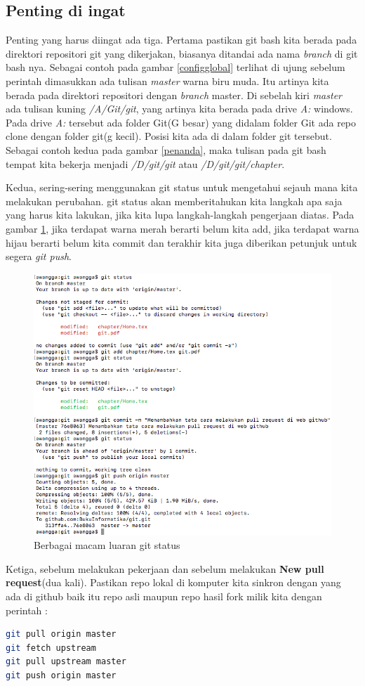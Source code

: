 \subsection{Penting di ingat}
Penting yang harus diingat ada tiga. Pertama pastikan git bash kita berada pada direktori repositori git yang dikerjakan, biasanya ditandai ada nama \textit{branch} di git bash nya. Sebagai contoh pada gambar \ref{configglobal} terlihat di ujung sebelum perintah dimasukkan ada tulisan \textit{master} warna biru muda. Itu artinya kita berada pada direktori repositori dengan \textit{branch} master. Di sebelah kiri \textit{master} ada tulisan kuning \textit{/A/Git/git}, yang artinya kita berada pada drive \textit{A:} windows. Pada drive \textit{A:} tersebut ada folder Git(G besar) yang didalam folder Git ada repo clone dengan folder git(g kecil). Posisi kita ada di dalam folder git tersebut.
Sebagai contoh kedua pada gambar \ref{penanda}, maka tulisan pada git bash tempat kita bekerja menjadi \textit{/D/git/git} atau \textit{/D/git/git/chapter}.

Kedua, sering-sering menggunakan git status untuk mengetahui sejauh mana kita melakukan perubahan. git status akan memberitahukan kita langkah apa saja yang harus kita lakukan, jika kita lupa langkah-langkah pengerjaan diatas. Pada gambar \ref{gitstatus}, jika terdapat warna merah berarti belum kita add, jika terdapat warna hijau berarti belum kita commit dan terakhir kita juga diberikan petunjuk untuk segera \textit{git push}.
\begin{figure}[!htbp]
\centerline{\includegraphics[width=.75\textwidth]{Figures/gitstatus}}
\caption{Berbagai macam luaran git status}
\label{gitstatus}
\end{figure}

Ketiga, sebelum melakukan pekerjaan dan sebelum melakukan \textbf{New pull request}(dua kali). Pastikan repo lokal di komputer kita sinkron dengan yang ada di github baik itu repo asli maupun repo hasil fork milik kita dengan perintah :
\begin{lstlisting}[language=sh, caption=Perintah Sinkronisasi dengan repo asal,breaklines]
git pull origin master
git fetch upstream
git pull upstream master
git push origin master
\end{lstlisting}
